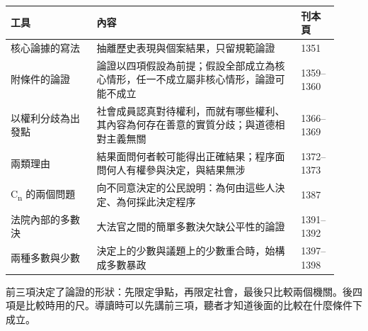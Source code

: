 \begin{longtable}{@{}L{0.24\linewidth}L{0.58\linewidth}L{0.10\linewidth}@{}}
\toprule
工具 & 內容 & 刊本頁 \\
\midrule
\endhead
核心論據的寫法 & 抽離歷史表現與個案結果，只留規範論證 & 1351 \\
附條件的論證 & 論證以四項假設為前提；假設全部成立為核心情形，任一不成立屬非核心情形，論證可能不成立 & 1359--1360 \\
以權利分歧為出發點 & 社會成員認真對待權利，而就有哪些權利、其內容為何存在善意的實質分歧；與道德相對主義無關 & 1366--1369 \\
兩類理由 & 結果面問何者較可能得出正確結果；程序面問何人有權參與決定，與結果無涉 & 1372--1373 \\
C\textsubscript{n} 的兩個問題 & 向不同意決定的公民說明：為何由這些人決定、為何採此決定程序 & 1387 \\
法院內部的多數決 & 大法官之間的簡單多數決欠缺公平性的論證 & 1391--1392 \\
兩種多數與少數 & 決定上的少數與議題上的少數重合時，始構成多數暴政 & 1397--1398 \\
\bottomrule
\end{longtable}

\begin{readernote}
前三項決定了論證的形狀：先限定爭點，再限定社會，最後只比較兩個機關。後四項是比較時用的尺。導讀時可以先講前三項，聽者才知道後面的比較在什麼條件下成立。
\end{readernote}
